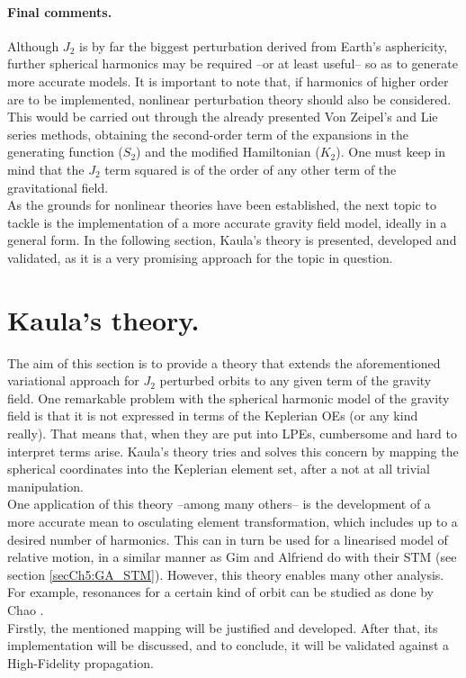 		\paragraph{Final comments. \\}
		\indent Although $J_2$ is by far the biggest perturbation derived from Earth's asphericity, further spherical harmonics may be required --or at least useful-- so as to generate more accurate models. It is important to note that, if harmonics of higher order are to be implemented, nonlinear perturbation theory should also be considered. This would be carried out through the already presented Von Zeipel's and Lie series methods, obtaining the second-order term of the expansions in the generating function ($S_2$) and the modified Hamiltonian ($K_2$). One must keep in mind that the $J_2$ term squared is of the order of any other term of the gravitational field. \\
		\indent As the grounds for nonlinear theories have been established, the next topic to tackle is the implementation of a more accurate gravity field model, ideally in a general form. In the following section, Kaula's theory is presented, developed and validated, as it is a very promising approach for the topic in question.
\section{Kaula's theory.}
%
\indent The aim of this section is to provide a theory that extends the aforementioned variational approach for $J_2$ perturbed orbits to any given term of the gravity field. One remarkable problem with the spherical harmonic model of the gravity field is that it is not expressed in terms of the Keplerian OEs (or any kind really). That means that, when they are put into LPEs, cumbersome and hard to interpret terms arise. Kaula's theory \cite{Kaula} tries and solves this concern by mapping the spherical coordinates into the Keplerian element set, after a not at all trivial manipulation. \\
%
\indent One application of this theory --among many others-- is the development of a more accurate mean to osculating element transformation, which includes up to a desired number of harmonics. This can in turn be used for a linearised model of relative motion, in a similar manner as Gim and Alfriend do with their STM (see section \ref{secCh5:GA_STM}). However, this theory enables many other analysis. For example, resonances for a certain kind of orbit can be studied as done by Chao \cite{Chao}.\\
%
\indent Firstly, the mentioned mapping will be justified and developed. After that, its implementation will be discussed, and to conclude, it will be validated against a High-Fidelity propagation.
%
